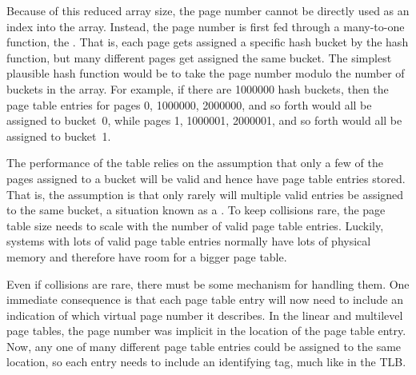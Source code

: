 Because of this reduced array size, the page number cannot be directly
used as an index into the array.  Instead, the page number is first fed through a
many-to-one function, the .  That is, each page
gets assigned a specific hash bucket by the hash function, but many
different pages get assigned the same bucket.  The simplest plausible
hash function would be to take the page number modulo the number of
buckets in the array.  For example, if there are 1000000 hash buckets,
then the page table entries for pages 0, 1000000, 2000000, and so
forth would all be assigned to bucket~0, while pages 1, 1000001,
2000001, and so forth would all be assigned to bucket~1.

The performance of the table relies on the assumption that only a few
of the pages assigned to a bucket will be valid and hence have page
table entries stored.  That is, the assumption is that only rarely
will multiple valid entries be assigned to the same bucket, a
situation known as a .  To keep collisions
rare, the page table size needs to scale with the number of valid page
table entries.  Luckily, systems with lots of valid page table entries
normally have lots of physical memory and therefore have room for a
bigger page table.

Even if collisions are rare, there must be some mechanism
for handling them.  One immediate consequence is that each page table
entry will now need to include an indication of which virtual page
number it describes.  In the linear and multilevel page tables, the
page number was implicit in the location of the page table entry.
Now, any one of many different page table entries could be assigned to
the same location, so each entry needs to include an identifying tag, much like
in the TLB.

